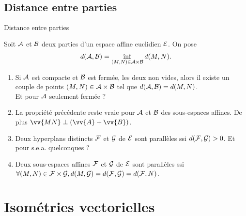 \documentclass{m53beamer}
\begin{document}
\subsection{Distance entre parties}
\begin{frame}{Distance entre parties}
  \begin{definition}
    Soit $\mathcal{A}$ et $\mathcal{B}$ deux parties d'un espace affine euclidien $\mathcal{E}$.
    On pose\forsimple{\vspace*{-.7\baselineskip}}
    \[
      d(\mathcal{A},\mathcal{B}) = \inf_{(M,N) \in \mathcal{A}\times\mathcal{B}}d(M,N).
    \]\forsimple{\vspace*{-.7\baselineskip}}
  \end{definition}
  \begin{enumerate}[<+(1)->]
    \item Si $\mathcal{A}$ est compacte et $\mathcal{B}$ est fermée, les deux non vides, alors il existe un couple de points $(M,N) \in \mathcal{A}\times\mathcal{B}$ tel que $d(\mathcal{A},\mathcal{B}) = d(M,N)$.\pause\\ Et pour $\mathcal{A}$ seulement fermée ?
    \item La propriété précédente reste vraie pour $\mathcal{A}$ et $\mathcal{B}$ des sous-espaces affines. De plus $\vv{MN}\perp(\vv{A}+\vv{B})$.
    \item Deux hyperplans distincts $\mathcal{F}$ et $\mathcal{G}$ de $\mathcal{E}$ sont parallèles ssi $d(\mathcal{F},\mathcal{G}) > 0$. \pause Et pour s.e.a. quelconques ?
    \item Deux sous-espaces affines $\mathcal{F}$ et $\mathcal{G}$ de $\mathcal{E}$ sont parallèles ssi $\forall (M,N) \in \mathcal{F}\times\mathcal{G}, d(M,\mathcal{G})=d(\mathcal{F},\mathcal{G})=d(\mathcal{F},N)$.
  \end{enumerate}
\end{frame}


\section{Isométries vectorielles}

\end{document}
